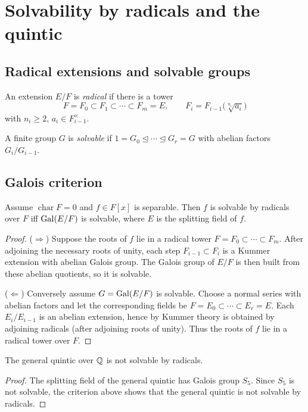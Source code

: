 \section{Solvability by radicals and the quintic}\label{sec:radicals-quintic}

\subsection{Radical extensions and solvable groups}
\begin{definition}
An extension $E/F$ is \emph{radical} if there is a tower
\[
F=F_0\subset F_1\subset\cdots\subset F_m=E,\qquad
F_i=F_{i-1}\bigl(\sqrt[n_i]{a_i}\bigr)
\]
with $n_i\ge2$, $a_i\in F_{i-1}^\times$.
\end{definition}
\begin{definition}
A finite group $G$ is \emph{solvable} if $1=G_0\trianglelefteq\cdots\trianglelefteq G_r=G$ with abelian factors $G_i/G_{i-1}$.
\end{definition}

\subsection{Galois criterion}
\begin{theorem}\label{thm:radicals-criterion}
Assume $\operatorname{char}F=0$ and $f\in F[x]$ is separable. Then $f$ is solvable by radicals over $F$ iff $\operatorname{Gal}(E/F)$ is solvable, where $E$ is the splitting field of $f$.
\end{theorem}
\begin{proof}
($\Rightarrow$) Suppose the roots of $f$ lie in a radical tower
$F=F_0\subset\cdots\subset F_m$.
After adjoining the necessary roots of unity, each step
$F_{i-1}\subset F_i$ is a Kummer extension with abelian Galois group.
The Galois group of $E/F$ is then built from these abelian quotients, so it is solvable.

($\Leftarrow$) Conversely assume $G=\operatorname{Gal}(E/F)$ is solvable.
Choose a normal series with abelian factors and let the corresponding
fields be $F=E_0\subset\cdots\subset E_r=E$.
Each $E_i/E_{i-1}$ is an abelian extension, hence by Kummer theory is
obtained by adjoining radicals (after adjoining roots of unity).
Thus the roots of $f$ lie in a radical tower over $F$.
\end{proof}
\begin{theorem}
The general quintic over $\mathbb{Q}$ is not solvable by radicals.
\end{theorem}
\begin{proof}
The splitting field of the general quintic has Galois group $S_5$.
Since $S_5$ is not solvable, the criterion above shows that the general
quintic is not solvable by radicals.
\end{proof}

